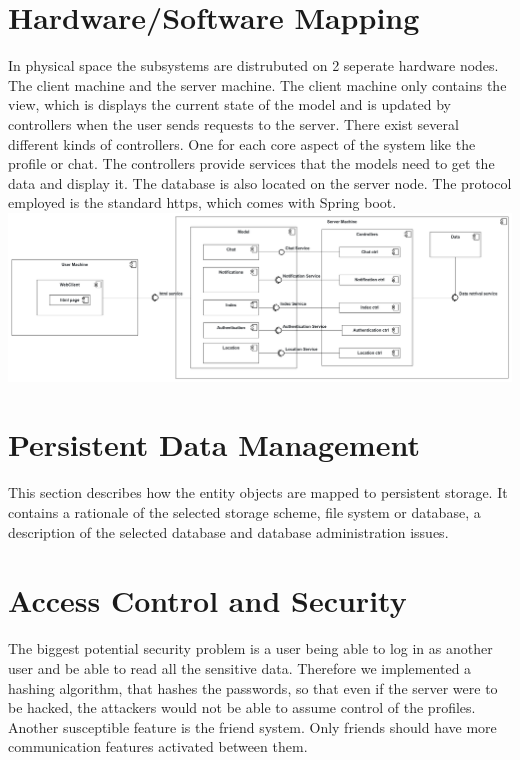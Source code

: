 \documentclass[a4paper,12pt]{scrartcl}
\begin{document}
    \section{Hardware/Software Mapping}
In physical space the subsystems are distrubuted on 2 seperate hardware nodes. The client machine and the server machine. The client machine only contains the view, which is displays the current state of the model and is updated by controllers when the user sends requests to the server. There exist several different kinds of controllers. One for each core aspect of the system like the profile or chat. The controllers provide services that the models need to get the data and display it. The database is also located on the server node. The protocol employed is the standard https, which comes with Spring boot.\\
    
    
    
    \includegraphics[scale=0.15]{HardwareSoftware.png}
    
    


    \section{Persistent Data Management}
    This section describes how the entity objects are mapped to persistent storage.
    It contains a rationale of the selected storage scheme, file system or database, a description of the selected database and database administration issues.


    \section{Access Control and Security}
    
    The biggest potential security problem is a user being able to log in as another user and be able to read all the sensitive data. Therefore we implemented a hashing algorithm, that hashes the passwords, so that even if the server were to be hacked, the attackers would not be able to assume control of the profiles. Another susceptible feature is the friend system. Only friends should have more communication features activated between them. \\ \\
    
\end{document}
